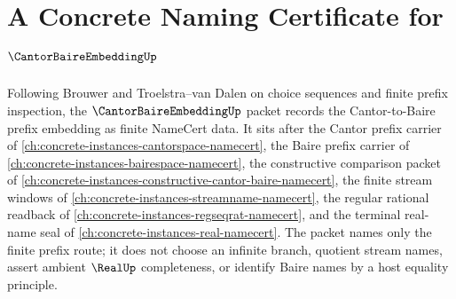 \chapter{A Concrete Naming Certificate for $\CantorBaireEmbeddingUp$}
\label{ch:concrete-instances-cantor-baire-embedding-namecert}

Following Brouwer and Troelstra--van Dalen on choice sequences and finite prefix inspection, the $\CantorBaireEmbeddingUp$ packet records the Cantor-to-Baire prefix embedding as finite NameCert data. It sits after the Cantor prefix carrier of \autoref{ch:concrete-instances-cantorspace-namecert}, the Baire prefix carrier of \autoref{ch:concrete-instances-bairespace-namecert}, the constructive comparison packet of \autoref{ch:concrete-instances-constructive-cantor-baire-namecert}, the finite stream windows of \autoref{ch:concrete-instances-streamname-namecert}, the regular rational readback of \autoref{ch:concrete-instances-regseqrat-namecert}, and the terminal real-name seal of \autoref{ch:concrete-instances-real-namecert}. The packet names only the finite prefix route; it does not choose an infinite branch, quotient stream names, assert ambient $\RealUp$ completeness, or identify Baire names by a host equality principle.

